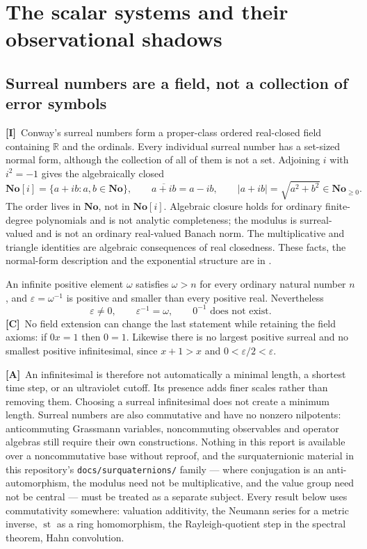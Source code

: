\documentclass[11pt,letterpaper]{article}
\numberwithin{equation}{section}
\theoremstyle{definition}
\theoremstyle{remark}
\newcommand{\No}{\mathbf{No}}
\newcommand{\SC}{\mathbf{No}[i]}
\newcommand{\R}{\mathbb R}
\newcommand{\eps}{\varepsilon}
\DeclareMathOperator{\st}{st}
\newcommand{\abs}[1]{\lvert#1\rvert}
\newcommand{\TC}{\textcolor{TierC}{\textsf{\bfseries[C]}}}
\newcommand{\TA}{\textcolor{TierA}{\textsf{\bfseries[A]}}}
\newcommand{\TI}{\textcolor{TierI}{\textsf{\bfseries[I]}}}
\begin{document}
\section{The scalar systems and their observational shadows}
\label{phys:sec:scalars}

\subsection{Surreal numbers are a field, not a collection of error symbols}
\label{phys:sub:field}

\TI\ Conway's surreal numbers form a proper-class ordered real-closed field
containing $\R$ and the ordinals. Every individual surreal number has a
set-sized normal form, although the collection of all of them is not a set.
Adjoining $i$ with $i^{2}=-1$ gives the algebraically closed
\begin{equation}\label{phys:eq:SC}
\SC=\{a+ib:a,b\in\No\},\qquad
\overline{a+ib}=a-ib,\qquad
\abs{a+ib}=\sqrt{a^{2}+b^{2}}\in\No_{\ge0}.
\end{equation}
The order lives in $\No$, not in $\SC$. Algebraic closure holds for ordinary
finite-degree polynomials and is not analytic completeness; the modulus is
surreal-valued and is not an ordinary real-valued Banach norm. The
multiplicative and triangle identities are algebraic consequences of real
closedness. These facts, the normal-form description and the exponential
structure are in \cite{phys:Conway,phys:Gonshor,phys:BM,phys:EK,phys:Ehrlich}.

An infinite positive element $\omega$ satisfies $\omega>n$ for every ordinary
natural number $n$, and $\eps=\omega^{-1}$ is positive and smaller than every
positive real. Nevertheless
\begin{equation}\label{phys:eq:nodivzero}
\eps\ne0,\qquad \eps^{-1}=\omega,\qquad 0^{-1}\text{ does not exist}.
\end{equation}
\TC\ No field extension can change the last statement while retaining the
field axioms: if $0x=1$ then $0=1$. Likewise there is no largest positive
surreal and no smallest positive infinitesimal, since $x+1>x$ and
$0<\eps/2<\eps$.

\TA\ An infinitesimal is therefore not automatically a minimal length, a
shortest time step, or an ultraviolet cutoff. Its presence adds finer scales
rather than removing them. Choosing a surreal infinitesimal does not create a
minimum length. Surreal numbers are also commutative and have no nonzero
nilpotents: anticommuting Grassmann variables, noncommuting observables and
operator algebras still require their own constructions. Nothing in this report
is available over a noncommutative base without reproof, and the
surquaternionic material in this repository's \texttt{docs/surquaternions/}
family --- where conjugation is an anti-automorphism, the modulus need not be
multiplicative, and the value group need not be central --- must be treated as
a separate subject. Every result below uses commutativity somewhere: valuation
additivity, the Neumann series for a metric inverse, $\st$ as a ring
homomorphism, the Rayleigh-quotient step in the spectral theorem, Hahn
convolution.
\end{document}
